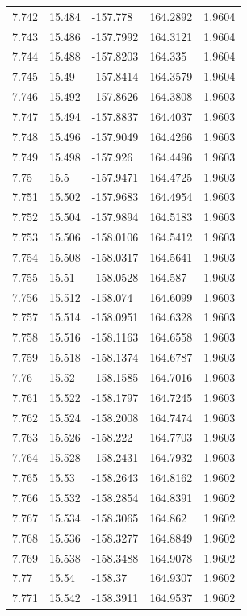 \begin{tabular}{lllll}
7.742 & 15.484 & -157.778 & 164.2892 & 1.9604 \\
7.743 & 15.486 & -157.7992 & 164.3121 & 1.9604 \\
7.744 & 15.488 & -157.8203 & 164.335 & 1.9604 \\
7.745 & 15.49 & -157.8414 & 164.3579 & 1.9604 \\
7.746 & 15.492 & -157.8626 & 164.3808 & 1.9603 \\
7.747 & 15.494 & -157.8837 & 164.4037 & 1.9603 \\
7.748 & 15.496 & -157.9049 & 164.4266 & 1.9603 \\
7.749 & 15.498 & -157.926 & 164.4496 & 1.9603 \\
7.75 & 15.5 & -157.9471 & 164.4725 & 1.9603 \\
7.751 & 15.502 & -157.9683 & 164.4954 & 1.9603 \\
7.752 & 15.504 & -157.9894 & 164.5183 & 1.9603 \\
7.753 & 15.506 & -158.0106 & 164.5412 & 1.9603 \\
7.754 & 15.508 & -158.0317 & 164.5641 & 1.9603 \\
7.755 & 15.51 & -158.0528 & 164.587 & 1.9603 \\
7.756 & 15.512 & -158.074 & 164.6099 & 1.9603 \\
7.757 & 15.514 & -158.0951 & 164.6328 & 1.9603 \\
7.758 & 15.516 & -158.1163 & 164.6558 & 1.9603 \\
7.759 & 15.518 & -158.1374 & 164.6787 & 1.9603 \\
7.76 & 15.52 & -158.1585 & 164.7016 & 1.9603 \\
7.761 & 15.522 & -158.1797 & 164.7245 & 1.9603 \\
7.762 & 15.524 & -158.2008 & 164.7474 & 1.9603 \\
7.763 & 15.526 & -158.222 & 164.7703 & 1.9603 \\
7.764 & 15.528 & -158.2431 & 164.7932 & 1.9603 \\
7.765 & 15.53 & -158.2643 & 164.8162 & 1.9602 \\
7.766 & 15.532 & -158.2854 & 164.8391 & 1.9602 \\
7.767 & 15.534 & -158.3065 & 164.862 & 1.9602 \\
7.768 & 15.536 & -158.3277 & 164.8849 & 1.9602 \\
7.769 & 15.538 & -158.3488 & 164.9078 & 1.9602 \\
7.77 & 15.54 & -158.37 & 164.9307 & 1.9602 \\
7.771 & 15.542 & -158.3911 & 164.9537 & 1.9602 \\

\end{tabular}
